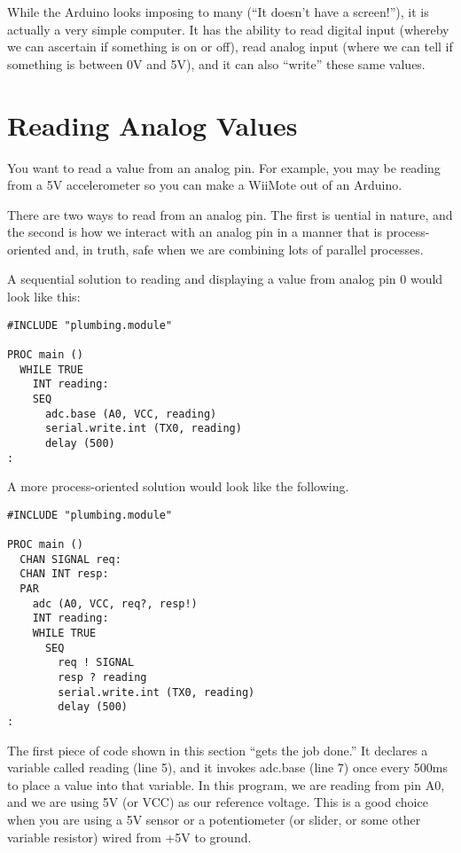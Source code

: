 While the Arduino looks imposing to many (``It doesn't have a screen!''), it is actually a very simple computer. It has the ability to read digital input (whereby we can ascertain if something is on or off), read analog input (where we can tell if something is between 0V and 5V), and it can also ``write'' these same values.

% 
\section{Reading Analog Values}
\problem
You want to read a value from an analog pin. For example, you may be reading from a 5V accelerometer so you can make a WiiMote out of an Arduino.

\solution
There are two ways to read from an analog pin. The first is {\SEQ}uential in nature, and the second is how we interact with an analog pin in a manner that is process-oriented and, in truth, safe when we are combining lots of parallel processes.

A sequential solution to reading and displaying a value from analog pin 0 would look like this:

\begin{lstlisting}
#INCLUDE "plumbing.module"

PROC main ()
  WHILE TRUE
    INT reading:
    SEQ
      adc.base (A0, VCC, reading)
      serial.write.int (TX0, reading)
      delay (500)
:
\end{lstlisting}

A more process-oriented solution would look like the following.

\begin{lstlisting}
#INCLUDE "plumbing.module"

PROC main ()
  CHAN SIGNAL req:
  CHAN INT resp:
  PAR
    adc (A0, VCC, req?, resp!)
    INT reading:
    WHILE TRUE
      SEQ
        req ! SIGNAL
        resp ? reading
        serial.write.int (TX0, reading)
        delay (500)
:
\end{lstlisting}

\discussion
The first piece of code shown in this section ``gets the job done.'' It declares a variable called {\code reading} (line 5), and it invokes {\code adc.base} (line 7) once every 500ms to place a value into that variable. In this program, we are reading from pin {\constant A0}, and we are using 5V (or {\constant VCC}) as our reference voltage. This is a good choice when you are using a 5V sensor or a potentiometer (or slider, or some other variable resistor) wired from +5V to ground.

